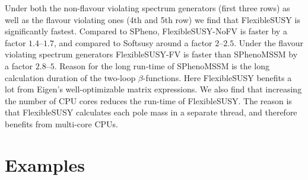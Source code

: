 \documentclass[final,3p,11pt,pdflatex]{elsarticle}
\newcommand{\fs}{FlexibleSUSY\xspace}
\begin{document}
Under both the non-flavour violating spectrum generators (first three
rows) as well as the flavour violating ones (4th and 5th row) we find
that \fs is significantly fastest.  Compared to SPheno,
FlexibleSUSY-NoFV is faster by a factor $1.4$--$1.7$, and compared to
Softsusy around a factor $2$--$2.5$.  Under the flavour violating
spectrum generators FlexibleSUSY-FV is faster than SPhenoMSSM by a
factor $2.8$--$5$.  Reason for the long run-time of SPhenoMSSM is the
long calculation duration of the two-loop $\beta$-functions.  Here \fs
benefits a lot from Eigen's well-optimizable matrix expressions.  We
also find that increasing the number of CPU cores reduces the run-time
of \fs.  The reason is that \fs calculates each pole mass in a
separate thread, and therefore benefits from multi-core CPUs.

\appendix
\section{Examples}
\end{document}
